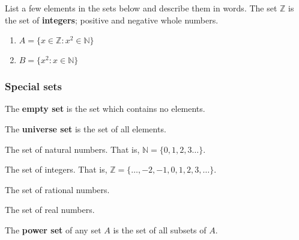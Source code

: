\documentclass[11pt, compress]{beamer}
\newcommand{\terminology}[1]{\textbf{#1}}\newcommand{\lt}{<}
\newcommand{\N}{\mathbb N}
\newcommand{\Z}{\mathbb Z}
\newcommand{\st}{:}
\begin{document}
\begin{frame}
\frametitle{}
\begin{example}[0.3.2]List a few elements in the sets below and describe them in words.  The set \(\Z\) is the set of \terminology{integers}; positive and negative whole numbers.\begin{enumerate}
\item{} \(A = \{x \in \Z \st x^2 \in \N\}\)


\item{} \(B = \{x^2 \st x \in \N\}\)

\end{enumerate}

\end{example}
\end{frame}
 
\begin{frame}
\frametitle{Special sets}
\begin{description}

\item{} The \terminology{empty set} is the set which contains no elements. \label{g:notation:idm59}


\item{} The \terminology{universe set} is the set of all elements. \label{g:notation:idm69}


\item{} The set of natural numbers. That is, \(\N = \{0, 1, 2, 3\ldots\}\). \label{g:notation:idm77}


\item{} The set of integers. That is, \(\Z = \{\ldots, -2, -1, 0, 1, 2, 3, \ldots\}\). \label{g:notation:idm89}


\item{} The set of rational numbers. \label{g:notation:idm96}


\item{} The set of real numbers. \label{g:notation:idm105}


\item{} The \terminology{power set} of any set \(A\) is the set of all subsets of \(A\). \label{g:notation:idm119}

\end{description}

\end{frame}
 
\end{document}
